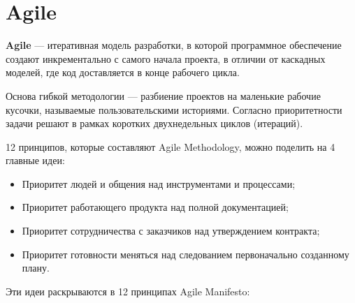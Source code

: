 \documentclass[a4paper,14pt]{extarticle}
\begin{document}
 	\section{Agile}
 	
 	{\bf Agile} — итеративная модель разработки, в которой программное обеспечение создают инкрементально с самого начала проекта, в отличии от каскадных моделей, где код доставляется в конце рабочего цикла.
 	
 	Основа гибкой методологии — разбиение проектов на маленькие рабочие кусочки, называемые пользовательскими историями. Согласно приоритетности задачи решают в рамках коротких двухнедельных циклов (итераций).
 	
 	12 принципов, которые составляют Agile Methodology, можно поделить на 4 главные идеи:
 	
 	\begin{itemize}
 		\item Приоритет людей и общения над инструментами и процессами;
 		\item Приоритет работающего продукта над полной документацией;
 		\item Приоритет сотрудничества с заказчиков над утверждением контракта;
 		\item Приоритет готовности меняться над следованием первоначально созданному плану.
 	\end{itemize}
 
 	Эти идеи раскрываются в 12 принципах Agile Manifesto:
 	
\end{document}
